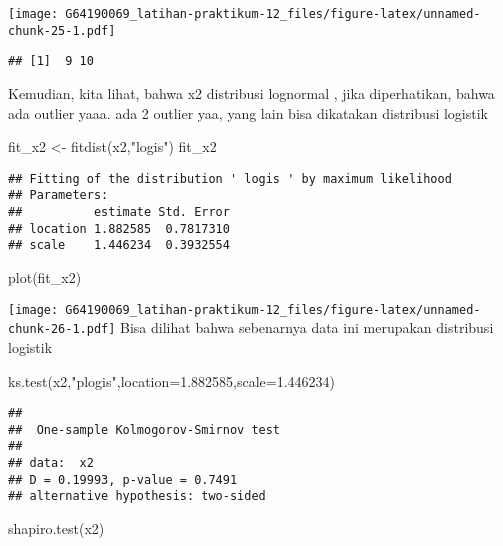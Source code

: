 \documentclass[
]{article}
\newenvironment{Shaded}{\begin{snugshade}}{\end{snugshade}}
\newcommand{\AttributeTok}[1]{\textcolor[rgb]{0.77,0.63,0.00}{#1}}
\newcommand{\FloatTok}[1]{\textcolor[rgb]{0.00,0.00,0.81}{#1}}
\newcommand{\FunctionTok}[1]{\textcolor[rgb]{0.00,0.00,0.00}{#1}}
\newcommand{\NormalTok}[1]{#1}
\newcommand{\OtherTok}[1]{\textcolor[rgb]{0.56,0.35,0.01}{#1}}
\newcommand{\StringTok}[1]{\textcolor[rgb]{0.31,0.60,0.02}{#1}}
\begin{document}
\texttt{[image: G64190069\_latihan-praktikum-12\_files/figure-latex/unnamed-chunk-25-1.pdf]}

\begin{verbatim}
## [1]  9 10
\end{verbatim}

Kemudian, kita lihat, bahwa x2 distribusi lognormal , jika diperhatikan,
bahwa ada outlier yaaa. ada 2 outlier yaa, yang lain bisa dikatakan
distribusi logistik

\begin{Shaded}
\begin{Highlighting}[]
\NormalTok{fit\_x2 }\OtherTok{\textless{}{-}} \FunctionTok{fitdist}\NormalTok{(x2,}\StringTok{"logis"}\NormalTok{)}
\NormalTok{fit\_x2}
\end{Highlighting}
\end{Shaded}

\begin{verbatim}
## Fitting of the distribution ' logis ' by maximum likelihood 
## Parameters:
##          estimate Std. Error
## location 1.882585  0.7817310
## scale    1.446234  0.3932554
\end{verbatim}

\begin{Shaded}
\begin{Highlighting}[]
\FunctionTok{plot}\NormalTok{(fit\_x2)}
\end{Highlighting}
\end{Shaded}

\texttt{[image: G64190069\_latihan-praktikum-12\_files/figure-latex/unnamed-chunk-26-1.pdf]}
Bisa dilihat bahwa sebenarnya data ini merupakan distribusi logistik

\begin{Shaded}
\begin{Highlighting}[]
\FunctionTok{ks.test}\NormalTok{(x2,}\StringTok{"plogis"}\NormalTok{,}\AttributeTok{location=}\FloatTok{1.882585}\NormalTok{,}\AttributeTok{scale=}\FloatTok{1.446234}\NormalTok{)}
\end{Highlighting}
\end{Shaded}

\begin{verbatim}
## 
##  One-sample Kolmogorov-Smirnov test
## 
## data:  x2
## D = 0.19993, p-value = 0.7491
## alternative hypothesis: two-sided
\end{verbatim}

\begin{Shaded}
\begin{Highlighting}[]
\FunctionTok{shapiro.test}\NormalTok{(x2)}
\end{Highlighting}
\end{Shaded}
\end{document}
